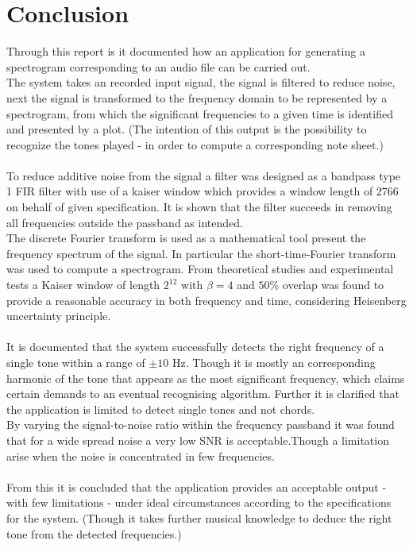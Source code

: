 \chapter{Conclusion}
Through this report is it documented how an application for generating a spectrogram corresponding to an audio file can be carried out.\\
The system takes an recorded input signal,  the signal is filtered to reduce noise, next the signal is transformed to the frequency domain to be represented by a spectrogram, from which the significant frequencies to a given time is identified and presented by a plot. (The intention of this output is the possibility to recognize the tones played - in order to compute a corresponding note sheet.)\\
\\
To reduce additive noise from the signal a  filter was designed as a bandpass type 1 FIR filter with use of a kaiser window which provides a window length of 2766 on behalf of given specification. It is shown that the filter succeeds in removing all frequencies outside the passband as intended.\\
The discrete Fourier transform is used as a mathematical tool present the frequency spectrum of the signal. In particular the short-time-Fourier transform was used to compute a spectrogram. From theoretical studies and experimental tests a Kaiser window of length $2^{12}$ with $\beta = 4$ and $50\%$ overlap was found to provide a reasonable accuracy in both frequency and time, considering Heisenberg uncertainty principle.\\
\\
It is documented that the system successfully detects the right frequency of a single tone within a range of $\pm 10$ Hz. Though it is mostly an corresponding harmonic of the tone that appears as the most significant frequency, which claims  certain demands to an eventual recognising algorithm. Further it is clarified that the application is limited to detect single tones and not chords. \\
By varying the signal-to-noise ratio within the frequency  passband it was found that for a wide spread noise a very low SNR is acceptable.Though a limitation arise when the noise is concentrated in few frequencies. \\ 
 \\
From this it is concluded that the application provides an acceptable output - with few limitations - under ideal circumstances according to the specifications for the system. (Though it takes further musical knowledge to deduce the right tone from the detected frequencies.)     \\

 